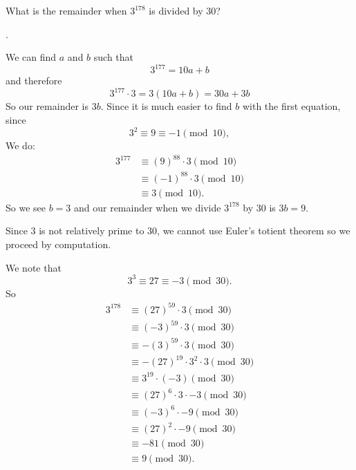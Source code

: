 \documentclass[11pt]{article}
\begin{document}
\begin{problem}What is the remainder when $3^{178}$ is divided by 30?
\end{problem}
\begin{answer}
.
\end{answer}
\begin{solutionone}
We can find $a$ and $b$ such that
$$3^{177} = 10a+b$$
and therefore
$$3^{177} \cdot 3 = 3(10a+b) = 30a+3b$$
So our remainder is $3b$. Since it is much easier to find $b$ with the first equation, since
$$3^2 \equiv 9 \equiv -1 \pmod{10},$$
We do:
\begin{align*}
3^{177} &\equiv (9)^{88} \cdot 3  \pmod{10} \\
&\equiv (-1)^{88} \cdot 3 \pmod{10} \\
&\equiv 3 \pmod{10}.
\end{align*}
So we see $b=3$ and our remainder when we divide $3^{178}$ by 30 is $3b = \boxed{9}$.
\end{solutionone}
\begin{solutiontwo}
Since 3 is not relatively prime to 30, we cannot use Euler's totient theorem so we proceed by computation. \par
We note that
$$3^3 \equiv 27 \equiv -3 \pmod{30}.$$
So
\begin{align*}
3^{178} &\equiv (27)^{59} \cdot 3 \pmod{30} \\
&\equiv (-3)^{59} \cdot 3 \pmod{30}\\
&\equiv -(3)^{59} \cdot 3 \pmod{30}\\
&\equiv -(27)^{19} \cdot 3^2 \cdot 3 \pmod{30}\\
&\equiv 3^{19} \cdot (-3) \pmod{30}\\
&\equiv (27)^6 \cdot 3 \cdot -3  \pmod{30}\\
&\equiv (-3)^6 \cdot -9 \pmod{30}\\
&\equiv (27)^2 \cdot -9 \pmod{30}\\
&\equiv -81 \pmod{30}\\
&\equiv \boxed{9} \pmod{30}.
\end{align*}
\end{solutiontwo}
\end{document}
